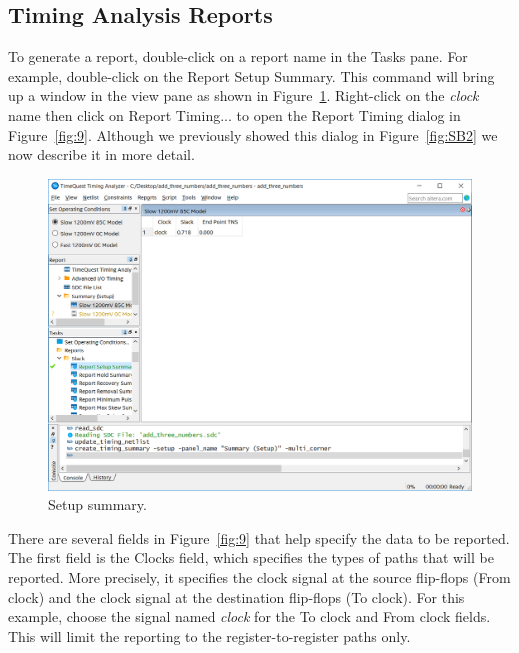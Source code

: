 \documentclass[11pt, twoside, pdftex]{article}
\begin{document}
\subsection{Timing Analysis Reports}

To generate a report, double-click on a report name in the Tasks pane. 
For example, double-click on the {\sf Report Setup Summary}. This command
will bring up a window in the view pane as shown in Figure~\ref{fig:7}. Right-click on the
{\it clock} name then click on {\sf Report Timing...} to open the Report Timing dialog in Figure~\ref{fig:9}. Although we previously 
showed this dialog in Figure~\ref{fig:SB2} we now describe it in more detail. 

\begin{figure}[H]
\begin{center}
\includegraphics[scale=0.5]{figures/figure7.png}
\end{center}
\caption{Setup summary.}
\label{fig:7}
\end{figure}

There are several fields in Figure~\ref{fig:9} that help specify the data to be reported. The 
first field is the {\sf Clocks} field, which specifies the types of paths that will be reported. 
More precisely, it specifies the clock signal at the source flip-flops ({\sf From clock}) 
and the clock signal at the destination flip-flops ({\sf To clock}).  For this example, choose 
the signal named {\it clock} for the 
{\sf To clock} and {\sf From clock} fields. This will limit the reporting to the 
register-to-register paths only.
\end{document}
